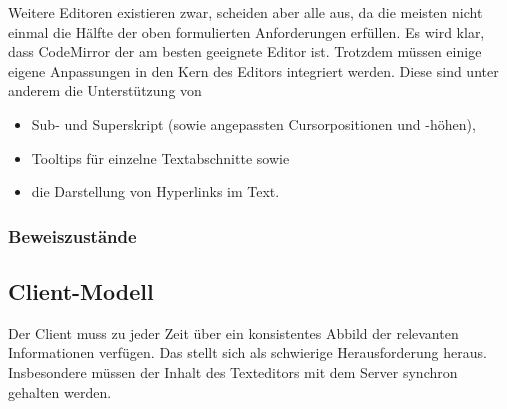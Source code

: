 Weitere Editoren existieren zwar, scheiden aber alle aus, da die meisten nicht einmal die Hälfte der
oben formulierten Anforderungen erfüllen. Es wird klar, dass CodeMirror der am besten geeignete
Editor ist. Trotzdem müssen einige eigene Anpassungen in den Kern des Editors integriert werden.
Diese sind unter anderem die Unterstützung von

\begin{itemize}
  \item Sub- und Superskript (sowie angepassten Cursorpositionen und -höhen),
  \item Tooltips für einzelne Textabschnitte sowie
  \item die Darstellung von Hyperlinks im Text.
\end{itemize}

\subsubsection{Beweiszustände}

\subsection{Client-Modell}

Der Client muss zu jeder Zeit über ein konsistentes Abbild der relevanten Informationen verfügen.
Das stellt sich als schwierige Herausforderung heraus. Insbesondere müssen der Inhalt des
Texteditors mit dem Server synchron gehalten werden.

